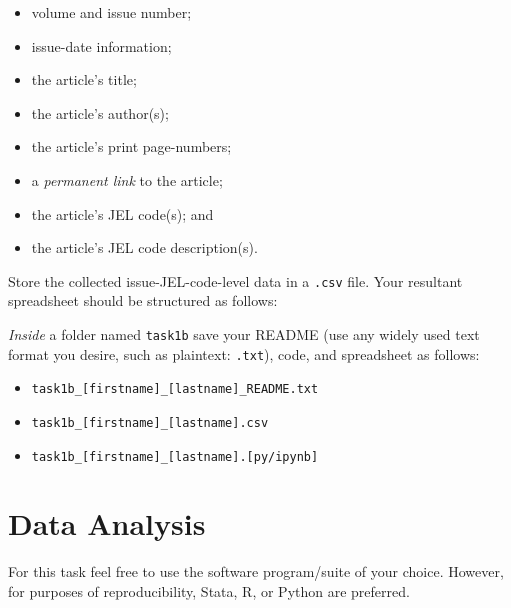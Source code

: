 \documentclass[11pt, letterpaper, twoside]{article}
\begin{document}
\begin{multicols}{2}
    \begin{itemize}
        \item volume and issue number;
        \item issue-date information;
        \item the article's title;
        \item the article's author(s);
        \item the article's print page-numbers;
        \item a \textit{permanent link} to the article;
        \item the article's JEL code(s); and 
        \item the article's JEL code description(s).
    \end{itemize}   
\end{multicols}

Store the collected issue-JEL-code-level data in a \verb|.csv| file. Your resultant spreadsheet should be structured as follows:

\textit{Inside} a folder named \verb|task1b| save your README (use any widely used text format you desire, such as plaintext: \verb|.txt|), code, and spreadsheet as follows:
\begin{itemize}
    \item \verb|task1b_[firstname]_[lastname]_README.txt|
    \item \verb|task1b_[firstname]_[lastname].csv|
    \item \verb|task1b_[firstname]_[lastname].[py/ipynb]|
\end{itemize}

\begin{landscape}
    \thispagestyle{empty}
    
\end{landscape}

\section{Data Analysis}

For this task feel free to use the software program/suite of your choice. However, for purposes of reproducibility, Stata, R, or Python are preferred.
\end{document}
